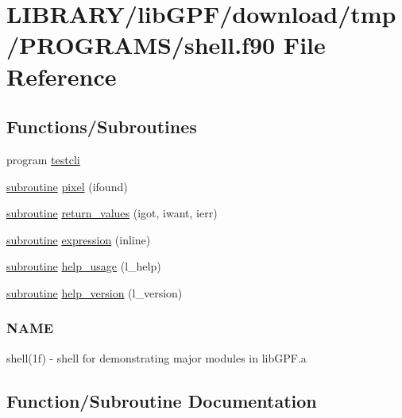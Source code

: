 \hypertarget{shell_8f90}{}\section{L\+I\+B\+R\+A\+R\+Y/lib\+G\+P\+F/download/tmp/\+P\+R\+O\+G\+R\+A\+M\+S/shell.f90 File Reference}
\label{shell_8f90}
\subsection*{Functions/\+Subroutines}
\begin{DoxyCompactItemize}
\item 
program \hyperlink{shell_8f90_a19f7365559e8816247241c4721e8eccb}{testcli}
\item 
\hyperlink{M__stopwatch_83_8txt_acfbcff50169d691ff02d4a123ed70482}{subroutine} \hyperlink{shell_8f90_a5c599e945a5e0c9c8954969ea48587cf}{pixel} (ifound)
\item 
\hyperlink{M__stopwatch_83_8txt_acfbcff50169d691ff02d4a123ed70482}{subroutine} \hyperlink{shell_8f90_a8e1579319e153f8b8d77b94fa94e9b37}{return\+\_\+values} (igot, iwant, ierr)
\item 
\hyperlink{M__stopwatch_83_8txt_acfbcff50169d691ff02d4a123ed70482}{subroutine} \hyperlink{shell_8f90_a90e360f745c7d1a295a3a4e2b865f9d7}{expression} (inline)
\item 
\hyperlink{M__stopwatch_83_8txt_acfbcff50169d691ff02d4a123ed70482}{subroutine} \hyperlink{shell_8f90_a3e09a3b52ee8fb04eeb93fe5761626a8}{help\+\_\+usage} (l\+\_\+help)
\item 
\hyperlink{M__stopwatch_83_8txt_acfbcff50169d691ff02d4a123ed70482}{subroutine} \hyperlink{shell_8f90_a39c21619b08a3c22f19e2306efd7f766}{help\+\_\+version} (l\+\_\+version)
\begin{DoxyCompactList}\small\item\em \subsubsection*{N\+A\+ME}

shell(1f) -\/ shell for demonstrating major modules in lib\+G\+P\+F.\+a \end{DoxyCompactList}\end{DoxyCompactItemize}


\subsection{Function/\+Subroutine Documentation}
\mbox{\label{shell_8f90_a90e360f745c7d1a295a3a4e2b865f9d7}} 
